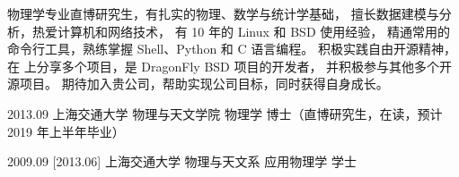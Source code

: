 \documentclass[zh]{resume}
\begin{document}
\makeheader

{\onehalfspacing\hspace{1.8em}
物理学专业直博研究生，有扎实的物理、数学与统计学基础，
擅长数据建模与分析，热爱计算机和网络技术，
有 10 年的 Linux 和 BSD 使用经验，
精通常用的命令行工具，熟练掌握 Shell、Python 和 C 语言编程。
积极实践自由开源精神，在 
上分享多个项目，是 DragonFly BSD 项目的开发者，
并积极参与其他多个开源项目。
期待加入贵公司，帮助实现公司目标，同时获得自身成长。
\par}  %

\begin{competences}
\end{competences}

\begin{educations}
  \education%
    {2013.09}%
    {上海交通大学}%
    {物理与天文学院}%
    {物理学}%
    {博士（直博研究生，在读，预计 2019 年上半年毕业）}

  \separator{0.7em}
  \education%
    {2009.09}%
    [2013.06]%
    {上海交通大学}%
    {物理与天文系}%
    {应用物理学}%
    {学士}
\end{educations}
\end{document}

